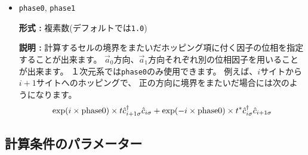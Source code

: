 \begin{itemize}
\item \verb|phase0|, \verb|phase1|

  {\bf 形式 :} 複素数(デフォルトでは\verb|1.0|)
  
  {\bf 説明 :} 計算するセルの境界をまたいだホッピング項に付く因子の位相を指定することが出来ます。
  $\vec{a}_0$方向、$\vec{a}_1$方向それぞれ別の位相因子を用いることが出来ます。
  １次元系では\verb|phase0|のみ使用できます。
  例えば、$i$サイトから$i+1$サイトへのホッピングで、
  正の方向に境界をまたいだ場合には次のようになります。
  \begin{align}
    \exp(i \times {\rm phase0}) \times t {\hat c}_{i+1 \sigma}^\dagger {\hat c}_{i \sigma}
    + \exp(-i \times {\rm phase0}) \times t^* {\hat c}_{i \sigma}^\dagger {\hat c}_{i+1 \sigma}
  \end{align}

\end{itemize}

\subsection{計算条件のパラメーター}

